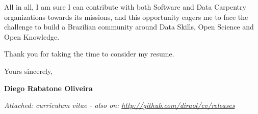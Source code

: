 \documentclass[11pt]{friggeri-cover-letter}
\begin{document}
\vfill

All in all, I am sure I can contribute with both Software and Data Carpentry
organizations towards its missions, and this opportunity eagers me to face the
challenge to build a Brazilian community around Data Skills, Open Science and
Open Knowledge.

\vfill

Thank you for taking the time to consider my resume.

\vfill

\hfill Yours sincerely,

\hfill \textbf{Diego Rabatone Oliveira}

\vfill

\footnotesize{\thinfont\color{lightgray}\textit{Attached: curriculum vitae - also on:} \textit{\url{http://github.com/diraol/cv/releases}}}
\end{document}
